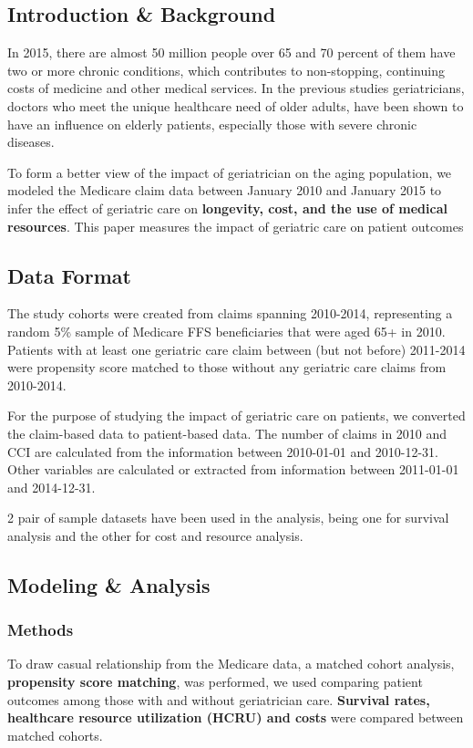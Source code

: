 \documentclass{article}
\begin{document}
	\subsection{Introduction \& Background} 
	In 2015, there are almost 50 million people over 65 and 70 percent of them have two or more chronic conditions, which contributes to non-stopping, continuing costs of medicine and other medical services. In the previous studies geriatricians, doctors who meet the unique healthcare need of older adults, have been shown to have an influence on elderly patients, especially those with severe chronic diseases. 
	
	To form a better view of the impact of geriatrician on the aging population, we modeled the Medicare claim data between January 2010 and January 2015 to infer the effect of geriatric care on \textbf{longevity, cost, and the use of medical resources}. This paper measures the impact of geriatric care on patient outcomes
	
	\subsection{Data Format}
	The study cohorts were created from claims spanning 2010-2014, representing a random 5\% sample of Medicare FFS beneficiaries that were aged 65+ in 2010. Patients with at least one geriatric care claim between (but not before) 2011-2014 were propensity score matched to those without any geriatric care claims from 2010-2014.
	
	For the purpose of studying the impact of geriatric care on patients, we converted the claim-based data to patient-based data. The number of claims in 2010 and CCI are calculated from the information between 2010-01-01 and 2010-12-31. Other variables are calculated or extracted from information between 2011-01-01 and 2014-12-31. 
	
	2 pair of sample datasets have been used in the analysis, being one for survival analysis and the other for cost and resource analysis.
	
	\subsection{Modeling \& Analysis}
	\subsubsection{Methods}
	To draw casual relationship from the Medicare data, a matched cohort analysis, \textbf{propensity score matching}, was performed, we used comparing patient outcomes among those with and without geriatrician care. \textbf{Survival rates, healthcare resource utilization (HCRU) and costs} were compared between matched cohorts.
	
\end{document}
